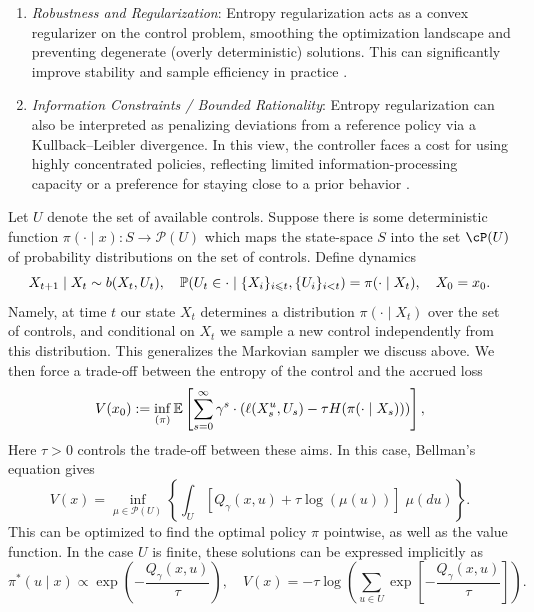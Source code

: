 \begin{subappendices}
\begin{enumerate}[label=(\roman*)]
    \item \textit{Robustness and Regularization}: Entropy regularization acts as a convex regularizer on the control problem, smoothing the optimization landscape and preventing degenerate (overly deterministic) solutions. This can significantly improve stability and sample efficiency in practice \cite{haarnoja2018_soft_actor_critic_arxiv}.

    \item \textit{Information Constraints / Bounded Rationality}: Entropy regularization can also be interpreted as penalizing deviations from a reference policy via a Kullback--Leibler divergence. In this view, the controller faces a cost for using highly concentrated policies, reflecting limited information-processing capacity or a preference for staying close to a prior behavior \cite{ortega2015_information_theoretic_bounded_rationality}.
\end{enumerate}

 Let $U$ denote the set of available controls. Suppose there is some deterministic function $\pi(\cdot \mid x) : S \to \mathcal{P}(U)$ which maps the state-space $S$ into the set  $\cP(U)$ of probability distributions on the set of controls. Define dynamics
%
\[X_{t+1} \mid X_t  \sim b(X_t, U_t), \quad \P(U_t \in \cdot \mid \{X_i\}_{i \leq t}, \{U_i\}_{i < t} ) =  \pi(\cdot \mid X_t), \quad X_0 = x_0.\]
%
\noindent Namely, at time $t$ our state $X_t$ determines a distribution $\pi(\cdot \mid X_t)$ over the set of controls, and conditional on $X_t$ we sample a new control independently from this distribution. This generalizes the Markovian sampler we discuss above. We then force a trade-off between the entropy of the control and the accrued loss
%
\[V(x_0) := \inf_{(\pi)} \E\left[\sum_{s=0}^\infty \gamma^s \cdot (\ell(X^u_s, U_s) - \tau H(\pi(\cdot \mid X_s)))\right],\]
%
\noindent Here $\tau > 0$ controls the trade-off between these aims. In this case, Bellman's equation gives
%
\[V(x) = \inf_{\mu \in \mathcal{P}(U)} \left\{\int_U \left[Q_\gamma(x,u) + \tau \log(\mu(u))\right] \; \mu(du)  \right\}.\]
%
\noindent This can be optimized to find the optimal policy $\pi$ pointwise, as well as the value function. In the case $U$ is finite,
these solutions can be expressed implicitly as
%
\begin{equation}
	\pi^*( u \mid x) \propto \exp\left(- \frac{Q_\gamma(x,u)}{\tau}\right), \quad V(x) = -\tau \log \left(\sum_{u \in U} \exp\left[- \frac{Q_\gamma(x,u)}{\tau}\right]\right).
	\label{eqn:optimal_entropy_regularized_policy}
\end{equation}



\end{subappendices}
